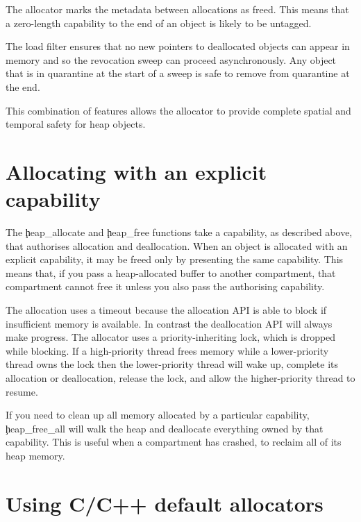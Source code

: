 \begin{note}
The allocator marks the metadata between allocations as freed.
This means that a zero-length capability to the end of an object is likely to be untagged.
\end{note}

The load filter ensures that no new pointers to deallocated objects can appear in memory and so the revocation sweep can proceed asynchronously.
Any object that is in quarantine at the start of a sweep is safe to remove from quarantine at the end.

This combination of features allows the allocator to provide complete spatial and temporal safety for heap objects.

\section{Allocating with an explicit capability}



The \c{heap_allocate} and \c{heap_free} functions take a capability, as described above, that authorises allocation and deallocation.
When an object is allocated with an explicit capability, it may be freed only by presenting the same capability.
This means that, if you pass a heap-allocated buffer to another compartment, that compartment cannot free it unless you also pass the authorising capability.

\begin{note}
	The allocation uses a timeout because the allocation API is able to block if insufficient memory is available.
	In contrast the deallocation API will always make progress.
	The allocator uses a priority-inheriting lock, which is dropped while blocking.
	If a high-priority thread frees memory while a lower-priority thread owns the lock then the lower-priority thread will wake up, complete its allocation or deallocation, release the lock, and allow the higher-priority thread to resume.
\end{note}

If you need to clean up all memory allocated by a particular capability, \c{heap_free_all} will walk the heap and deallocate everything owned by that capability.
This is useful when a compartment has crashed, to reclaim all of its heap memory.


\section{Using C/C++ default allocators}

